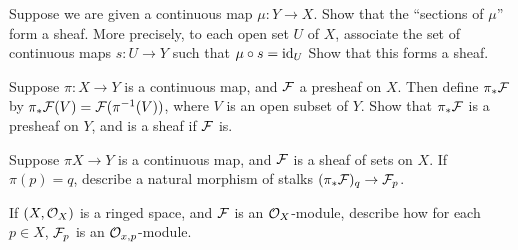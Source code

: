 \begin{exercise} Suppose we are given a continuous map $\mu: Y \to X$. Show that the ``sections of $\mu$'' form a sheaf. More precisely, to each open set $U$ of $X$, associate the set of continuous maps $s: U \to Y$ such that $\mu \circ s = \text{id}_U$ Show that this forms a sheaf. 
\end{exercise}

\begin{exercise}
    Suppose $\pi: X \to Y$ is a continuous map, and $\mathcal{F}$ a presheaf on $X$. Then define $\pi_*\mathcal{F}$ by $\pi_*\mathcal{F}(V) = \mathcal{F}(\pi^{-1}(V))$, where $V$ is an open subset of $Y$. Show that $\pi_*\mathcal{F}$ is a presheaf on $Y$, and is a sheaf if $\mathcal{F}$ is.
\end{exercise}

\begin{exercise}
    Suppose $\pi X \to Y$ is a continuous map, and $\mathcal{F}$ is a sheaf of sets on $X$. If $\pi(p)= q$, describe a natural morphism of stalks $(\pi_*\mathcal{F})_q \to \mathcal{F}_p$. 
\end{exercise}

\begin{exercise}
    If $(X, \mathcal{O}_X)$ is a ringed space, and $\mathcal{F}$ is an $\mathcal{O}_X$-module, describe how for each $p \in X$, $\mathcal{F}_p$ is an $\mathcal{O}_{x, p}$-module. 
\end{exercise}